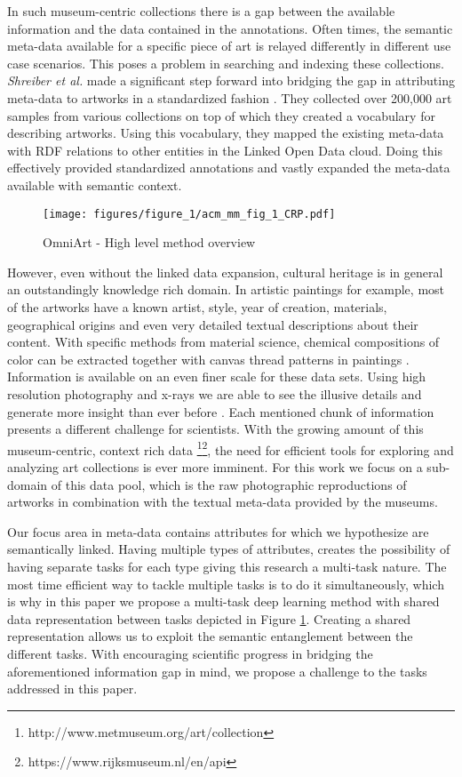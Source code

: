\documentclass[sigconf]{acmart}
\begin{document}
In such museum-centric collections there is a gap between the available information and the data contained in the annotations. Often times, the semantic meta-data available for a specific piece of art is relayed differently in different use case scenarios. This poses a problem in searching and indexing these collections. \textit{Shreiber et al.} made a significant step forward into bridging the gap in attributing meta-data to artworks in a standardized fashion \cite{schreiber2008semantic}. They collected over 200,000 art samples from various collections on top of which they created a vocabulary for describing artworks. Using this vocabulary, they mapped the existing meta-data with RDF relations to other entities in the Linked Open Data cloud. Doing this effectively provided standardized annotations and vastly expanded the meta-data available with semantic context.

\begin{figure}

  \texttt{[image: figures/figure\_1/acm\_mm\_fig\_1\_CRP.pdf]}
  \caption{OmniArt - High level method overview\label{fig:figure_1}}
\end{figure}

However, even without the linked data expansion, cultural heritage is in general an outstandingly knowledge rich domain. In artistic paintings for example, most of the artworks have a known artist, style, year of creation, materials, geographical origins and even very detailed textual descriptions about their content. With specific methods from material science, chemical compositions of color can be extracted together with canvas thread patterns in paintings \cite{yang2015quantitative}. Information is available on an even finer scale for these data sets. Using high resolution photography and x-rays \cite{klockenkamper2000analysis, chung1999industrial} we are able to see the illusive details and generate more insight than ever before \cite{pouyet20152d}. Each mentioned chunk of information presents a different challenge for scientists. With the growing amount of this museum-centric, context rich data \footnote{http://www.metmuseum.org/art/collection}\footnote{https://www.rijksmuseum.nl/en/api}, the need for efficient tools for exploring and analyzing art collections is ever more imminent. For this work we focus on a sub-domain of this data pool, which is the raw photographic reproductions of artworks in combination with the textual meta-data provided by the museums.

Our focus area in meta-data contains attributes for which we hypothesize are semantically linked. Having multiple types of attributes, creates the possibility of having separate tasks for each type giving this research a multi-task nature. The most time efficient way to tackle multiple tasks is to do it simultaneously, which is why in this paper we propose a multi-task deep learning method with shared data representation between tasks depicted in Figure \ref{fig:figure_1}. Creating a shared representation allows us to exploit the semantic entanglement between the different tasks. With encouraging scientific progress in bridging the aforementioned information gap in mind, we propose a challenge to the tasks addressed in this paper.
\end{document}
